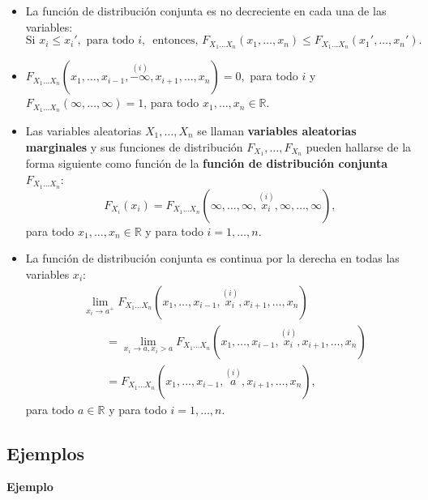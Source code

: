 \documentclass[]{book}
\begin{document}
\begin{itemize}
\item
  La función de distribución conjunta es no decreciente en cada una de las variables:
  \[
  \mbox{Si }x_i\leq x_i', \mbox{ para todo $i$, }\mbox{ entonces, }F_{X_1\ldots X_n}(x_1,\ldots,x_n)\leq F_{X_1\ldots X_n}(x_1',\ldots,x_n').
  \]
\item
  \(F_{X_1\ldots X_n}(x_1,\ldots,x_{i-1},\stackrel{(i)}{-\infty},x_{i+1},\ldots,x_n)=0,\) para todo \(i\) y \(F_{X_1\ldots X_n}(\infty,\ldots,\infty)=1\), para todo \(x_1,\ldots,x_n\in\mathbb{R}\).
\item
  Las variables aleatorias \(X_1,\ldots, X_n\) se llaman \textbf{variables aleatorias marginales} y sus funciones de distribución \(F_{X_1},\ldots, F_{X_n}\) pueden hallarse de la forma siguiente como función de la \textbf{función de distribución conjunta} \(F_{X_1\ldots X_n}\):
  \[
  F_{X_i}(x_i)=F_{X_1\ldots X_n}(\infty,\ldots,\infty,\stackrel{(i)}{x_i},\infty,\ldots,\infty),
  \]
  para todo \(x_1,\ldots,x_n\in\mathbb{R}\) y para todo \(i=1,\ldots,n\).
\item
  La función de distribución conjunta es continua por la derecha en todas las variables \(x_i\):
  \[
  \begin{array}{rl}
   & \lim\limits_{x_i\to a^+}F_{X_1\ldots X_n}(x_1,\ldots,x_{i-1},\stackrel{(i)}{x_i},x_{i+1},\ldots,x_n) \\ &\qquad =\lim\limits_{x_i\to a, x_i> a}F_{X_1\ldots X_n}(x_1,\ldots,x_{i-1},\stackrel{(i)}{x_i},x_{i+1},\ldots,x_n)\\ &\qquad =F_{X_1\ldots X_n}(x_1,\ldots,x_{i-1},\stackrel{(i)}{a},x_{i+1},\ldots,x_n),
  \end{array}
  \]
  para todo \(a\in\mathbb{R}\) y para todo \(i=1,\ldots,n\).
\end{itemize}

\hypertarget{ejemplos-9}{%
\subsection{Ejemplos}\label{ejemplos-9}}

\textbf{Ejemplo}
\end{document}
